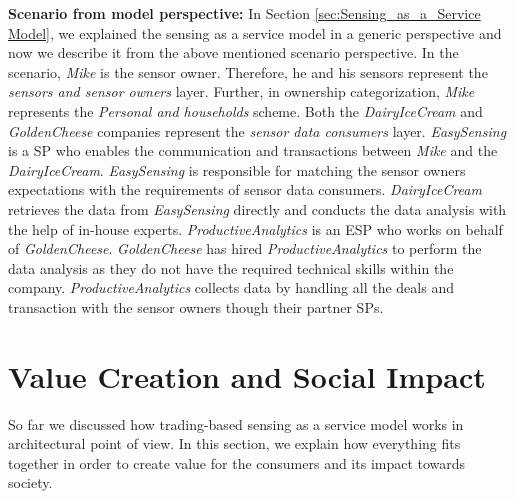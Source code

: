 \documentclass[conference]{IEEEtran}
\begin{document}
\textbf{Scenario from model perspective:} In Section \ref{sec:Sensing_as_a_Service Model}, we explained the sensing as a service model in a generic perspective and now we describe it from the above mentioned scenario perspective. In the scenario, \textit{Mike} is the sensor owner. Therefore, he and his sensors represent the \textit{sensors and sensor owners} layer. Further, in ownership categorization, \textit{Mike} represents the \textit{Personal and households} scheme. Both the \textit{DairyIceCream} and \textit{GoldenCheese} companies represent the \textit{sensor data consumers} layer. \textit{EasySensing} is a SP who enables the communication and transactions between \textit{Mike} and the \textit{DairyIceCream}. \textit{EasySensing} is responsible for matching the sensor owners expectations  with the requirements of sensor data consumers. \textit{DairyIceCream} retrieves the data from \textit{EasySensing} directly and conducts the data analysis with the help of in-house experts. \textit{ProductiveAnalytics} is an ESP who works on behalf of \textit{GoldenCheese}. \textit{GoldenCheese} has hired \textit{ProductiveAnalytics} to perform the data analysis as they do not have the required technical skills within the company. \textit{ProductiveAnalytics} collects data by handling all the deals and transaction with the sensor owners though their partner SPs.




\section{Value Creation and Social Impact}
\label{sec:Value_Creation}

So far we discussed how trading-based sensing as a service model works in architectural  point of view.  In this section, we explain how everything fits together in order to create value for the consumers and its impact towards society.
\end{document}
